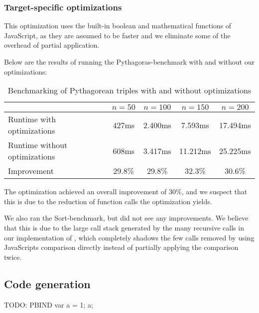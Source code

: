 \subsubsection{Target-specific optimizations}

This optimization uses the built-in boolean and mathematical functions of JavaScript, as they are assumed to be faster and we eliminate some of the overhead of partial application.

Below are the results of running the Pythagoras-benchmark with and without our optimizations:

\begin{table}[h]
  \centering
  \begin{tabular}{|l|c|c|c|c|}
    \hline
                   & $n = 50$ & $n = 100$ & $n = 150$ & $n = 200$ \\
    \hline
    Runtime with optimizations & 427ms & 2.400ms  & 7.593ms & 17.494ms            \\
    Runtime without optimizations & 608ms & 3.417ms & 11.212ms  & 25.225ms             \\
    Improvement & 29.8\% & 29.8\% & 32.3\%  & 30.6\%             \\
    \hline
  \end{tabular}
  \caption{Benchmarking of Pythagorean triples with and without optimizations}
\end{table}

The optimization achieved an overall improvement of 30\%, and we suspect that this is due to the reduction of function calls the optimization yields.

We also ran the Sort-benchmark, but did not see any improvements. We believe that this is due to the large call stack generated by the many recursive calls in our implementation of , which completely shadows the few calls removed by using JavaScripts comparison directly instead of partially applying the comparison twice.


\subsection{Code generation}
TODO: PBIND var a = 1; a;
